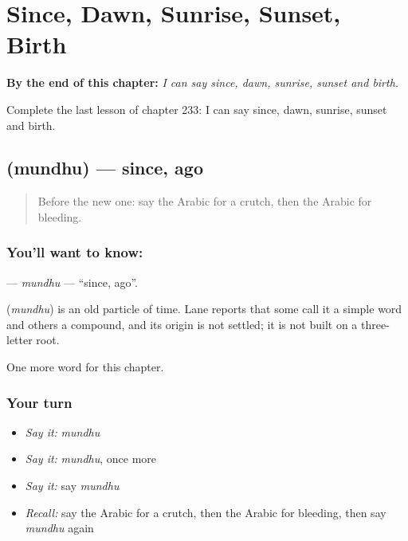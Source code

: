 
\chapter{Since, Dawn, Sunrise, Sunset, Birth}
\label{ch:ar-since-dawn-sunrise-sunset-birth}

\begin{chapteropening}
\textbf{By the end of this chapter:} \emph{I can say since, dawn, sunrise, sunset and birth.}

Complete the last lesson of chapter 233: I can say since, dawn, sunrise, sunset and birth.
\end{chapteropening}

\section[\texorpdfstring{\ar{منذ} (mundhu)}{منذ (mundhu)}]{ (mundhu) — since, ago}

\label{lesson:AR-C233-mundhu}



\begin{quote}
Before the new one: say the Arabic for a crutch, then the Arabic for bleeding.
\end{quote}

\subsection*{You'll want to know: }
\textbf{} — \emph{mundhu} — \textquotedblleft{}since, ago\textquotedblright{}.

\begin{cousinweb}
\textbf{} (\emph{mundhu}) is an old particle of time. Lane reports that some call it a simple word and others a compound, and its origin is not settled; it is not built on a three-letter root.
\end{cousinweb}

\begin{grammarlens}[title={What you've built}]
One more word for this chapter.
\end{grammarlens}

\subsection*{Your turn}
\begin{itemize}
\raggedright
  \item \emph{Say it:} \emph{mundhu}
  \item \emph{Say it:} \emph{mundhu}, once more
  \item \emph{Say it:} say \emph{mundhu}
  \item \emph{Recall:} say the Arabic for a crutch, then the Arabic for bleeding, then say \emph{mundhu} again
\end{itemize}

